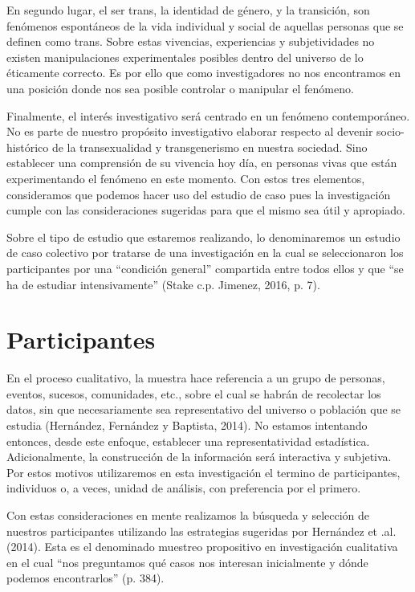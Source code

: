 En segundo lugar, el ser trans, la identidad de género, y la transición, son
fenómenos espontáneos de la vida individual y social de aquellas personas que se
definen como trans.
Sobre estas vivencias, experiencias y subjetividades no existen manipulaciones
experimentales posibles dentro del universo de lo éticamente correcto.
Es por ello que como investigadores no nos encontramos en una posición donde nos
sea posible controlar o manipular el fenómeno.

Finalmente, el interés investigativo será centrado en un fenómeno contemporáneo.
No es parte de nuestro propósito investigativo elaborar respecto al devenir
socio-histórico de la transexualidad y transgenerismo en nuestra sociedad.
Sino establecer una comprensión de su vivencia hoy día, en personas vivas que
están experimentando el fenómeno en este momento.
Con estos tres elementos, consideramos que podemos hacer uso del estudio de caso
pues la investigación cumple con las consideraciones sugeridas para que el mismo
sea útil y apropiado.

Sobre el tipo de estudio que estaremos realizando, lo denominaremos un estudio
de caso colectivo por tratarse de una investigación en la cual se seleccionaron
los participantes por una “condición general” compartida entre todos ellos y que
“se ha de estudiar intensivamente” (Stake c.p. Jimenez, 2016, p. 7).

\section{Participantes}
En el proceso cualitativo, la muestra hace referencia a un grupo de personas,
eventos, sucesos, comunidades, etc., sobre el cual se habrán de recolectar los
datos, sin que necesariamente sea representativo del universo o población que se
estudia (Hernández, Fernández y Baptista, 2014).
No estamos intentando entonces, desde este enfoque, establecer una
representatividad estadística.
Adicionalmente, la construcción de la información será interactiva y subjetiva.
Por estos motivos utilizaremos en esta investigación el termino de
participantes, individuos o, a veces, unidad de análisis, con preferencia por el
primero.

Con estas consideraciones en mente realizamos la búsqueda y selección de
nuestros participantes utilizando las estrategias sugeridas por Hernández et
.al. (2014).
Esta es el denominado muestreo propositivo en investigación cualitativa en el
cual “nos preguntamos qué casos nos interesan inicialmente y dónde podemos
encontrarlos” (p. 384).

